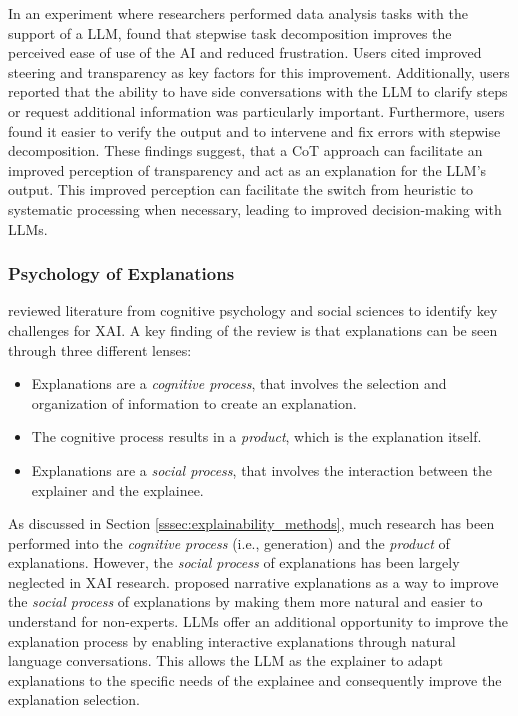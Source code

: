 In an experiment where researchers performed data analysis tasks with the support of a \ac{LLM}, \cite{Kazemitabaar2024} found that stepwise task decomposition improves the perceived ease of use of the \ac{AI} and reduced frustration. Users cited improved steering and transparency as key factors for this improvement. Additionally, users reported that the ability to have side conversations with the \ac{LLM} to clarify steps or request additional information was particularly important. Furthermore, users found it easier to verify the output and to intervene and fix errors with stepwise decomposition. These findings suggest, that a \ac{CoT} approach can facilitate an improved perception of transparency and act as an explanation for the \ac{LLM}'s output. This improved perception can facilitate the switch from heuristic to systematic processing when necessary, leading to improved decision-making with \acp{LLM}.

\subsubsection{Psychology of Explanations} \label{sssec:psychology_explanations}

\cite{Miller2019} reviewed literature from cognitive psychology and social sciences to identify key challenges for \ac{XAI}. A key finding of the review is that explanations can be seen through three different lenses:

\begin{itemize}
    \item Explanations are a \textit{cognitive process}, that involves the selection and organization of information to create an explanation.
    \item The cognitive process results in a \textit{product}, which is the explanation itself.
    \item Explanations are a \textit{social process}, that involves the interaction between the explainer and the explainee.
\end{itemize}

As discussed in Section \ref{sssec:explainability_methods}, much research has been performed into the \textit{cognitive process} (i.e., generation) and the \textit{product} of explanations. However, the \textit{social process} of explanations has been largely neglected in \ac{XAI} research. \cite{Martens2025} proposed narrative explanations as a way to improve the \textit{social process} of explanations by making them more natural and easier to understand for non-experts. \acp{LLM} offer an additional opportunity to improve the explanation process by enabling interactive explanations through natural language conversations. This allows the \ac{LLM} as the explainer to adapt explanations to the specific needs of the explainee and consequently improve the explanation selection.

